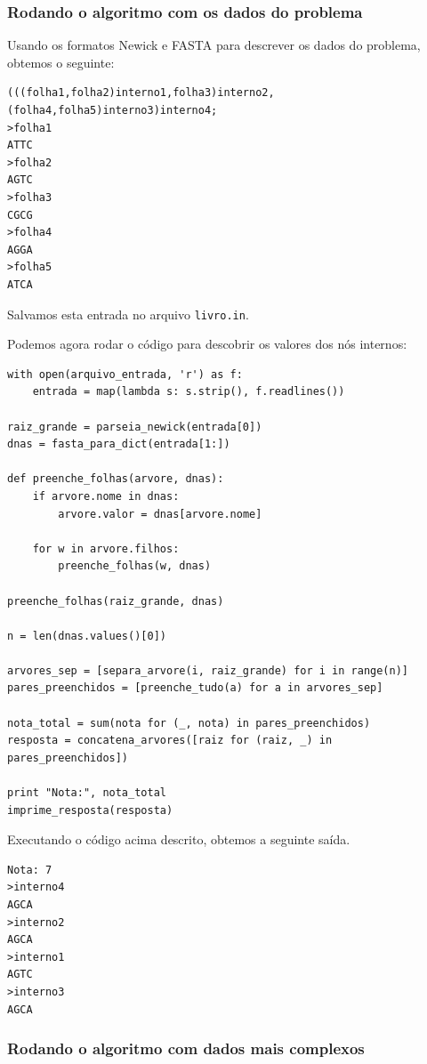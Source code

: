 \documentclass[11pt]{article}
\begin{document}
\subsubsection{Rodando o algoritmo com os dados do problema}
\label{sec-4-3-5}

Usando os formatos Newick e FASTA para descrever os dados do problema,
obtemos o seguinte:

\begin{verbatim}
(((folha1,folha2)interno1,folha3)interno2,(folha4,folha5)interno3)interno4;
>folha1
ATTC
>folha2
AGTC
>folha3
CGCG
>folha4
AGGA
>folha5
ATCA
\end{verbatim}

Salvamos esta entrada no arquivo \verb~livro.in~.

Podemos agora rodar o código para descobrir os valores dos nós internos:

\begin{verbatim}
with open(arquivo_entrada, 'r') as f:
    entrada = map(lambda s: s.strip(), f.readlines())

raiz_grande = parseia_newick(entrada[0])
dnas = fasta_para_dict(entrada[1:])

def preenche_folhas(arvore, dnas):
    if arvore.nome in dnas:
        arvore.valor = dnas[arvore.nome]

    for w in arvore.filhos:
        preenche_folhas(w, dnas)

preenche_folhas(raiz_grande, dnas)

n = len(dnas.values()[0])

arvores_sep = [separa_arvore(i, raiz_grande) for i in range(n)]
pares_preenchidos = [preenche_tudo(a) for a in arvores_sep]

nota_total = sum(nota for (_, nota) in pares_preenchidos)
resposta = concatena_arvores([raiz for (raiz, _) in pares_preenchidos])

print "Nota:", nota_total
imprime_resposta(resposta)
\end{verbatim}

Executando o código acima descrito, obtemos a seguinte saída.

\begin{verbatim}
Nota: 7
>interno4
AGCA
>interno2
AGCA
>interno1
AGTC
>interno3
AGCA
\end{verbatim}

\subsubsection{Rodando o algoritmo com dados mais complexos}
\label{sec-4-3-6}
\end{document}

